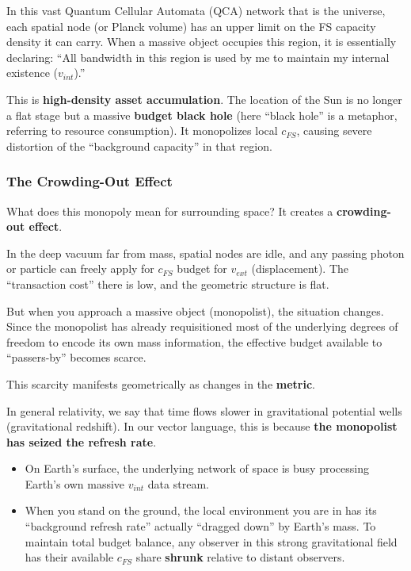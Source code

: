 In this vast Quantum Cellular Automata (QCA) network that is the universe, each spatial node (or Planck volume) has an upper limit on the FS capacity density it can carry. When a massive object occupies this region, it is essentially declaring: ``All bandwidth in this region is used by me to maintain my internal existence ($v_{int}$).''

This is \textbf{high-density asset accumulation}. The location of the Sun is no longer a flat stage but a massive \textbf{budget black hole} (here ``black hole'' is a metaphor, referring to resource consumption). It monopolizes local $c_{FS}$, causing severe distortion of the ``background capacity'' in that region.

\subsubsection{The Crowding-Out Effect}

What does this monopoly mean for surrounding space? It creates a \textbf{crowding-out effect}.

In the deep vacuum far from mass, spatial nodes are idle, and any passing photon or particle can freely apply for $c_{FS}$ budget for $v_{ext}$ (displacement). The ``transaction cost'' there is low, and the geometric structure is flat.

But when you approach a massive object (monopolist), the situation changes. Since the monopolist has already requisitioned most of the underlying degrees of freedom to encode its own mass information, the effective budget available to ``passers-by'' becomes scarce.

This scarcity manifests geometrically as changes in the \textbf{metric}.

In general relativity, we say that time flows slower in gravitational potential wells (gravitational redshift). In our vector language, this is because \textbf{the monopolist has seized the refresh rate}.

\begin{itemize}
\item On Earth's surface, the underlying network of space is busy processing Earth's own massive $v_{int}$ data stream.

\item When you stand on the ground, the local environment you are in has its ``background refresh rate'' actually ``dragged down'' by Earth's mass. To maintain total budget balance, any observer in this strong gravitational field has their available $c_{FS}$ share \textbf{shrunk} relative to distant observers.
\end{itemize}

